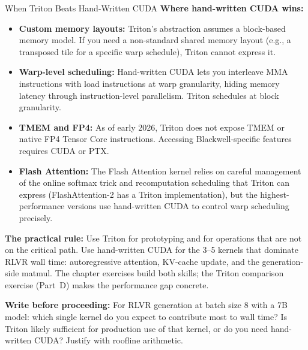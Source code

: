 \begin{thinkfirst}{When Triton Beats Hand-Written CUDA}
\textbf{Where hand-written CUDA wins:}
\begin{itemize}
  \item \textbf{Custom memory layouts:} Triton's abstraction assumes a block-based memory model. If you need a non-standard shared memory layout (e.g., a transposed tile for a specific warp schedule), Triton cannot express it.
  \item \textbf{Warp-level scheduling:} Hand-written CUDA lets you interleave MMA instructions with load instructions at warp granularity, hiding memory latency through instruction-level parallelism. Triton schedules at block granularity.
  \item \textbf{TMEM and FP4:} As of early 2026, Triton does not expose TMEM or native FP4 Tensor Core instructions. Accessing Blackwell-specific features requires CUDA or PTX.
  \item \textbf{Flash Attention:} The Flash Attention kernel relies on careful management of the online softmax trick and recomputation scheduling that Triton can express (FlashAttention-2 has a Triton implementation), but the highest-performance versions use hand-written CUDA to control warp scheduling precisely.
\end{itemize}

\textbf{The practical rule:} Use Triton for prototyping and for operations that are not on the critical path. Use hand-written CUDA for the 3--5 kernels that dominate RLVR wall time: autoregressive attention, KV-cache update, and the generation-side matmul. The chapter exercises build both skills; the Triton comparison exercise (Part~D) makes the performance gap concrete.

\textbf{Write before proceeding:} For RLVR generation at batch size 8 with a 7B model: which single kernel do you expect to contribute most to wall time? Is Triton likely sufficient for production use of that kernel, or do you need hand-written CUDA? Justify with roofline arithmetic.
\end{thinkfirst}

